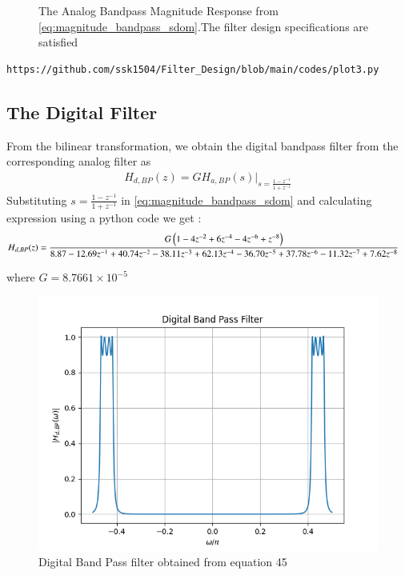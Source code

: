 \documentclass{article}
\begin{document}
\begin{enumerate}
\begin{figure}[H]
\caption{The Analog Bandpass Magnitude Response from \eqref{eq:magnitude_bandpass_sdom}.The filter design specifications are satisfied}
\label{fig:band_pass_filter}
\end{figure}

\begin{lstlisting}
https://github.com/ssk1504/Filter_Design/blob/main/codes/plot3.py
\end{lstlisting}
\end{enumerate}

\subsection{The Digital Filter}
From the bilinear transformation, we obtain the digital bandpass filter from the corresponding analog filter as
\begin{align}
    H_{d,BP}(z) = GH_{a,BP}(s)\vert_{s = \frac{1-z^{-1}}{1 + z^{-1}}}
\end{align}
Substituting $s=\frac{1-z^{-1}}{1+z^{-1}}$ in \eqref{eq:magnitude_bandpass_sdom} and calculating expression using a python code we get :
\begin{align}
    H_{d,BP}(z) &= \frac{G\left(1 - 4z^{-2} + 6z^{-4} - 4z^{-6} + z^{-8}\right)}{8.87  -12.69z^{-1} + 40.74z^{-2}  -38.11z^{-3}+  62.13z^{-4}
  -36.70z^{-5}+   37.78z^{-6}  -11.32z^{-7} +   7.62z^{-8}}
\end{align}

where $G=8.7661\times 10^{-5}$    

\begin{figure}[H]
    \centering
    \includegraphics[width=.9\linewidth]{figs/Digital_BPF.png}
    \caption{Digital Band Pass filter obtained from equation 45}
\end{figure}
\end{document}
